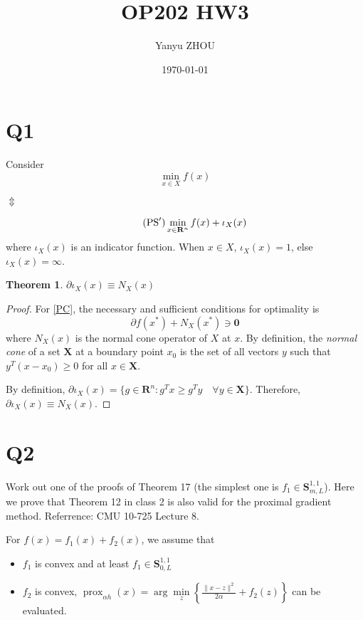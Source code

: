 \documentclass[12pt]{article}
\title{OP202 HW3}
\author{Yanyu ZHOU}
\date{\today}
\theoremstyle{mystyle}
\newtheorem{thm}[equation]{Theorem}
\begin{document}
\maketitle
\section{Q1}
Consider
\begin{equation} \label{PC}
\tag{$PC$} 
    \min _{x \in X} f(x)
\end{equation}

\begin{center}
    $\Updownarrow$
\end{center}
\begin{equation}
    \tag{$\mathrm{PS}^{\prime}$}
    \min _{x \in \mathbf{R}^n} f(x)+\iota_X(x)
\end{equation}
where $\iota_X(x)$ is an indicator function. When $x\in X$, $\iota_X(x) = 1$, else $\iota_X(x) = \infty$.

\begin{thm}
    $\partial \iota_X(x) \equiv N_X(x)$
\end{thm}

\begin{proof}
For \eqref{PC}, the necessary and sufficient conditions for optimality is
$$
\partial f\left(x^*\right)+N_X\left(x^*\right) \ni \mathbf{0}
$$
where $N_X(x)$ is the normal cone operator of $X$ at $x$. By definition, the \textit{normal cone} of a set $\mathbf{X}$ at a boundary point $x_0$ is the set of all vectors
$y$ such that $y^T(x-x_0) \geq 0$ for all $x \in \mathbf{X}$.

By definition, $\partial \iota_X(x) = \{g \in \mathbf{R}^n: g^Tx \geq g^Ty \quad \forall y\in \mathbf{X} \}$.
Therefore, $\partial \iota_X(x) \equiv N_X(x)$.
\end{proof}

\section{Q2}
Work out one of the proofs of Theorem 17 (the simplest one is $f_1 \in \mathbf{S}^{1,1}_{m,L}$).
Here we prove that Theorem 12 in class 2 is also valid for the proximal gradient method. Referrence: CMU 10-725 Lecture 8.

For $f(x) = f_1(x) + f_2(x)$, we assume that 
\begin{itemize}
    \item $f_1$ is convex and at least $f_1 \in \mathbf{S}^{1,1}_{0,L}$
    \item $f_2$ is convex, $\operatorname{prox}_{\alpha h} (x)=\arg \min\limits_z\left\{\frac{\|x-z\|^2}{2 \alpha}+f_2(z)\right\}$ can be evaluated.
\end{itemize}
\end{document}
